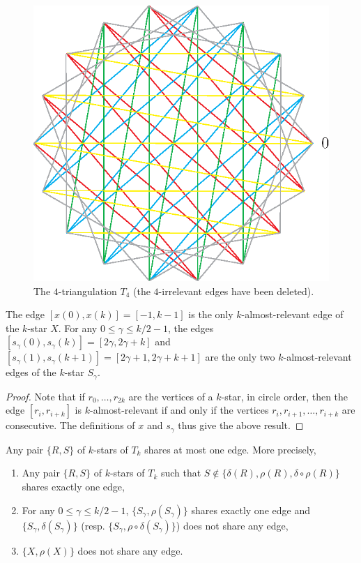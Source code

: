 \documentclass[12pt]{amsart}
\begin{document}
\begin{figure}
\centerline{\includegraphics[scale=1]{18-gon.eps}}
\caption{\small{The $4$-triangulation $T_4$ (the $4$-irrelevant edges have been deleted).}}\label{18-gon}
\end{figure}

\begin{lemma}
The edge $[x(0),x(k)]=[-1,k-1]$ is the only $k$-almost-relevant edge of the $k$-star $X$. For any $0\le\gamma\le k/2-1$, the edges $[s_\gamma(0),s_{\gamma}(k)]=[2\gamma,2\gamma+k]$ and $[s_\gamma(1),s_{\gamma}(k+1)]=[2\gamma+1,2\gamma+k+1]$ are the only two $k$-almost-relevant edges of the $k$-star $S_\gamma$.
\end{lemma}

\begin{proof}
Note that if $r_0,\ldots,r_{2k}$ are the vertices of a $k$-star, in circle order, then the edge $[r_i,r_{i+k}]$ is $k$-almost-relevant if and only if the vertices $r_i,r_{i+1},\ldots, r_{i+k}$ are consecutive. The definitions of $x$ and $s_\gamma$ thus give the above result.
\end{proof}

\begin{lemma}
Any pair $\{R,S\}$ of $k$-stars of $T_k$ shares at most one edge. More precisely,
\begin{enumerate}
\item Any pair $\{R,S\}$ of $k$-stars of $T_k$ such that $S\notin\{\delta(R),\rho(R),\delta\circ\rho(R)\}$ shares exactly one edge,
\item For any $0\le\gamma\le k/2-1$, $\{S_\gamma,\rho(S_\gamma)\}$ shares exactly one edge and $\{S_\gamma,\delta(S_\gamma)\}$ (resp. $\{S_\gamma,\rho\circ\delta(S_\gamma)\}$) does not share any edge,
\item $\{X,\rho(X)\}$ does not share any edge.
\end{enumerate}
\end{lemma}
\end{document}
